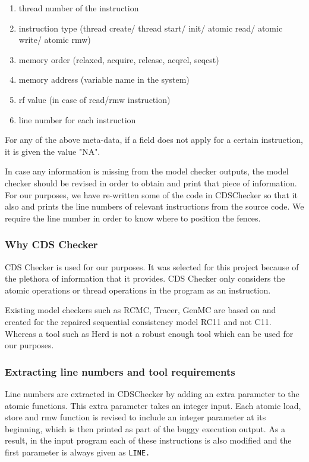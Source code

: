 \begin{enumerate}
	\item thread number of the instruction
	\item instruction type (thread create/ thread start/ init/ atomic read/ atomic write/ atomic rmw)
	\item memory order (relaxed, acquire, release, acq\textunderscore rel, seq\textunderscore cst)
	\item memory address (variable name in the system)
	\item rf value (in case of read/rmw instruction)
	\item line number for each instruction
\end{enumerate}

\par
For any of the above meta-data, if a field does not apply for a certain instruction, it is given the value "NA".

\par
In case any information is missing from the model checker outputs, the model checker should be revised in order to obtain and print that piece of information. For our purposes, we have re-written some of the code in CDSChecker so that it also and prints the line numbers of relevant instructions from the source code. We require the line number in order to know where to position the fences.

\subsubsection{Why CDS Checker}
CDS Checker is used for our purposes. It was selected for this project because of the plethora of information that it provides. CDS Checker only considers the atomic operations or thread operations in the program as an instruction.

Existing model checkers such as RCMC, Tracer, GenMC are based on and created for the repaired sequential consistency model RC11 and not C11. Whereas a tool such as Herd is not a robust enough tool which can be used for our purposes. 

\subsubsection{Extracting line numbers and tool requirements}
Line numbers are extracted in CDSChecker by adding an extra parameter to the atomic functions. This extra parameter takes an integer input. Each atomic load, store and rmw function is revised to include an integer parameter at its beginning, which is then printed as part of the buggy execution output. As a result, in the input program each of these instructions is also modified and the first parameter is always given as \tt{\textunderscore\textunderscore LINE\textunderscore\textunderscore}.

